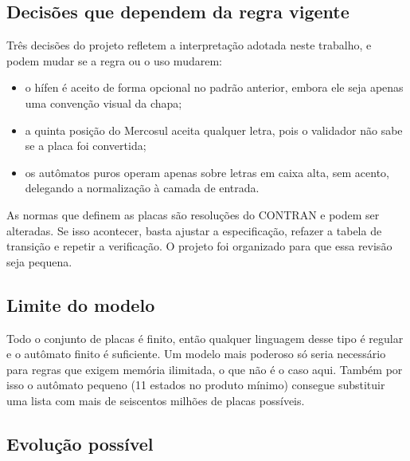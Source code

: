 \subsection{Decisões que dependem da regra vigente}

Três decisões do projeto refletem a interpretação adotada neste
trabalho, e podem mudar se a regra ou o uso mudarem:

\begin{itemize}
  \item o hífen é aceito de forma opcional no padrão anterior,
        embora ele seja apenas uma convenção visual da chapa;
  \item a quinta posição do Mercosul aceita qualquer letra, pois o
        validador não sabe se a placa foi convertida;
  \item os autômatos puros operam apenas sobre letras em caixa alta,
        sem acento, delegando a normalização à camada de entrada.
\end{itemize}

As normas que definem as placas são resoluções do CONTRAN
\cite{contran780,contran741} e podem ser alteradas. Se isso
acontecer, basta ajustar a especificação, refazer a tabela de
transição e repetir a verificação. O projeto foi organizado para
que essa revisão seja pequena.

\subsection{Limite do modelo}

Todo o conjunto de placas é finito, então qualquer linguagem desse
tipo é regular e o autômato finito é suficiente. Um modelo mais
poderoso só seria necessário para regras que exigem memória
ilimitada, o que não é o caso aqui. Também por isso o autômato
pequeno (11 estados no produto mínimo) consegue substituir uma lista
com mais de seiscentos milhões de placas possíveis.

\subsection{Evolução possível}

